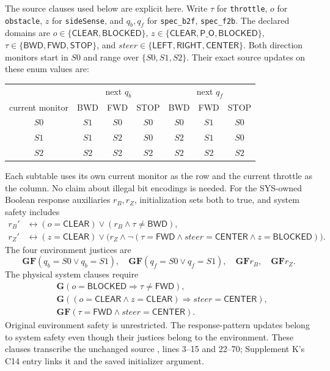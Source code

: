 The source clauses used below are explicit here. Write $\tau$ for
\texttt{throttle}, $o$ for \texttt{obstacle}, $z$ for \texttt{sideSense},
and $q_b,q_f$ for \texttt{spec\_b2f}, \texttt{spec\_f2b}.
The declared domains are $o\in\{\mathsf{CLEAR},\mathsf{BLOCKED}\}$,
$z\in\{\mathsf{CLEAR},\mathsf{P\_O},\mathsf{BLOCKED}\}$,
$\tau\in\{\mathsf{BWD},\mathsf{FWD},\mathsf{STOP}\}$, and
$\mathit{steer}\in\{\mathsf{LEFT},\mathsf{RIGHT},\mathsf{CENTER}\}$.
Both direction monitors start in $S0$ and range over $\{S0,S1,S2\}$.
Their exact source updates on these enum values are:
\begin{center}
\begin{tabular}{@{}c|ccc|ccc@{}}
\toprule
& \multicolumn{3}{c|}{next $q_b$} & \multicolumn{3}{c}{next $q_f$}\\
current monitor & BWD & FWD & STOP & BWD & FWD & STOP\\
\midrule
$S0$ & $S1$ & $S0$ & $S0$ & $S0$ & $S1$ & $S0$\\
$S1$ & $S1$ & $S2$ & $S0$ & $S2$ & $S1$ & $S0$\\
$S2$ & $S2$ & $S2$ & $S2$ & $S2$ & $S2$ & $S2$\\
\bottomrule
\end{tabular}
\end{center}
Each subtable uses its own current monitor as the row and the current
throttle as the column. No claim about illegal bit encodings is needed.
For the SYS-owned Boolean response auxiliaries $r_B,r_Z$, initialization
sets both to true, and system safety includes
\[
\begin{aligned}
r_B'&\leftrightarrow (o=\mathsf{CLEAR})\lor
 (r_B\land\tau\ne\mathsf{BWD}),\\
r_Z'&\leftrightarrow (z=\mathsf{CLEAR})\lor
 \bigl(r_Z\land\neg(\tau=\mathsf{FWD}\land
 \mathit{steer}=\mathsf{CENTER}\land z=\mathsf{BLOCKED})\bigr).
\end{aligned}
\]
The four environment justices are
\[
\mathbf{G}\mathbf{F}(q_b=S0\lor q_b=S1),\quad
\mathbf{G}\mathbf{F}(q_f=S0\lor q_f=S1),\quad
\mathbf{G}\mathbf{F}r_B,\quad\mathbf{G}\mathbf{F}r_Z.
\]
The physical system clauses require
\[
\begin{aligned}
&\mathbf{G}(o=\mathsf{BLOCKED}\Rightarrow\tau\ne\mathsf{FWD}),\\
&\mathbf{G}((o=\mathsf{CLEAR}\land z=\mathsf{CLEAR})
 \Rightarrow\mathit{steer}=\mathsf{CENTER}),\\
&\mathbf{G}\mathbf{F}(\tau=\mathsf{FWD}\land\mathit{steer}=\mathsf{CENTER}).
\end{aligned}
\]
Original environment safety is unrestricted. The response-pattern updates
belong to system safety even though their justices belong to the environment.
These clauses transcribe the unchanged source
, lines 3--15 and 22--70;
Supplement K's C14 entry links it and the saved initializer argument.

